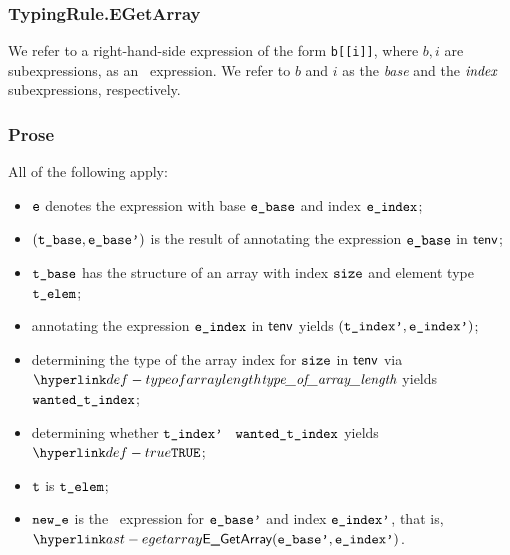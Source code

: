 \subsubsection{TypingRule.EGetArray\label{sec:TypingRule.EGetArray}}
\hypertarget{def-arrayaccess}{}
\begin{definition}
We refer to a right-hand-side expression of the form \texttt{b[[i]]},
where $b, i$ are subexpressions, as an \arrayaccess\ expression.
We refer to $b$ and $i$ as the \emph{base}
and the $\emph{index}$ subexpressions, respectively.
\end{definition}

\subsubsection{Prose}
All of the following apply:
\begin{itemize}
  \item $\texttt{e}$ denotes the \arrayaccess{} expression with base $\texttt{e\_base}$ and index $\texttt{e\_index}$;
  \item $(\texttt{t\_base},\texttt{e\_base'})$ is the result of annotating the expression $\texttt{e\_base}$ in $\textsf{tenv}$\ProseOrTypeError;
  \item $\texttt{t\_base}$ has the structure of an array with index $\texttt{size}$ and element type $\texttt{t\_elem}$\ProseOrTypeError;
  \item annotating the expression $\texttt{e\_index}$ in $\textsf{tenv}$ yields $(\texttt{t\_index'}, \texttt{e\_index'})$\ProseOrTypeError;
  \item determining the type of the array index for $\texttt{size}$ in $\textsf{tenv}$ via \\ $\typeofarraylength$
        yields $\texttt{wanted\_t\_index}$;
  \item determining whether $\texttt{t\_index'}$ \typesatisfies\ $\texttt{wanted\_t\_index}$ yields \\
        $\True$\ProseOrTypeError;
  \item $\texttt{t}$ is $\texttt{t\_elem}$;
  \item $\texttt{new\_e}$ is the \arrayaccess\ expression for $\texttt{e\_base'}$ and index $\texttt{e\_index'}$, that is, $\EGetArray(\ebasep, \eindexp)$.
\end{itemize}
